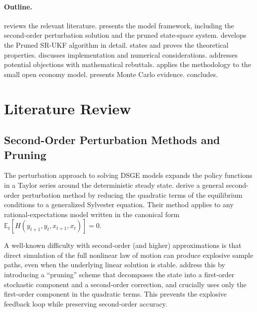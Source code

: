 \documentclass[12pt,a4paper]{article}
\newcommand{\E}{\mathbb{E}}
\begin{document}
\paragraph{Outline.}
 reviews the relevant literature.
 presents the model framework, including the
second-order perturbation solution and the pruned state-space system.
 develops the Pruned SR-UKF algorithm in detail.
 states and proves the theoretical properties.
 discusses implementation and numerical
considerations.
 addresses potential objections with
mathematical rebuttals.
 applies the methodology to the
\citet{schmitt2003closing} small open economy model.
 presents Monte Carlo evidence.
 concludes.


\section{Literature Review}\label{sec:literature}

\subsection{Second-Order Perturbation Methods and Pruning}

The perturbation approach to solving DSGE models expands the policy
functions in a Taylor series around the deterministic steady state.
\citet{schmitt2004solving} derive a general second-order perturbation
method by reducing the quadratic terms of the equilibrium conditions
to a generalized Sylvester equation. Their method applies to any
rational-expectations model written in the canonical form
$\E_t[H(y_{t+1}, y_t, x_{t+1}, x_t)] = 0$.

A well-known difficulty with second-order (and higher) approximations
is that direct simulation of the full nonlinear law of motion can
produce explosive sample paths, even when the underlying linear
solution is stable. \citet{kim2008calculating} address this by
introducing a ``pruning'' scheme that decomposes the state into a
first-order stochastic component and a second-order correction, and
crucially uses only the first-order component in the quadratic terms.
This prevents the explosive feedback loop while preserving second-order
accuracy.
\end{document}
